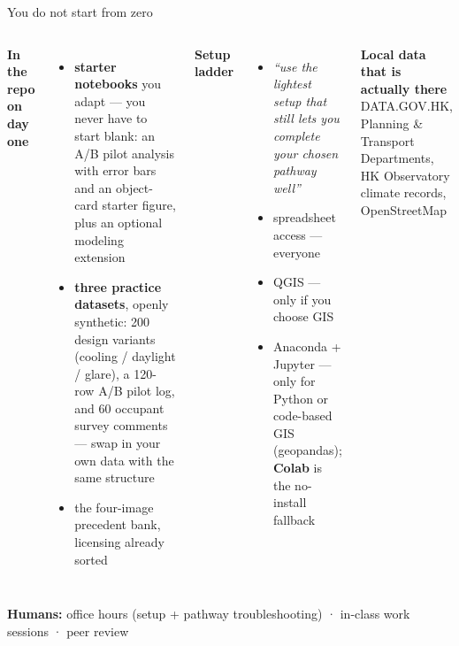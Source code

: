 \documentclass[aspectratio=169,10pt]{beamer}
\begin{document}
\begin{frame}{You do not start from zero}
  \footnotesize
  \begin{columns}[T]
    {\small\textbf{In the repo on day one}}
    \begin{itemize}
      \item \textbf{starter notebooks} you adapt --- you never have to start
            blank: an A/B pilot analysis with error bars and an object-card
            starter figure, plus an optional modeling extension
      \item \textbf{three practice datasets}, openly synthetic: 200 design
            variants (cooling / daylight / glare), a 120-row A/B pilot log,
            and 60 occupant survey comments --- swap in your own data with
            the same structure
      \item the four-image precedent bank, licensing already sorted
    \end{itemize}
    {\small\textbf{Setup ladder}}
    \begin{itemize}
      \item \emph{``use the lightest setup that still lets you complete your
            chosen pathway well''}
      \item spreadsheet access --- everyone
      \item QGIS --- only if you choose GIS
      \item Anaconda + Jupyter --- only for Python or code-based GIS
            (geopandas); \textbf{Colab} is the no-install fallback
    \end{itemize}
    {\small\textbf{Local data that is actually there}}\\
    DATA.GOV.HK, Planning \& Transport Departments,
    HK Observatory climate records, OpenStreetMap\par
  \end{columns}
  \vspace{1.5mm}
  \small\textbf{Humans:} office hours (setup + pathway troubleshooting) ·
  in-class work sessions · peer review
\end{frame}
\end{document}
